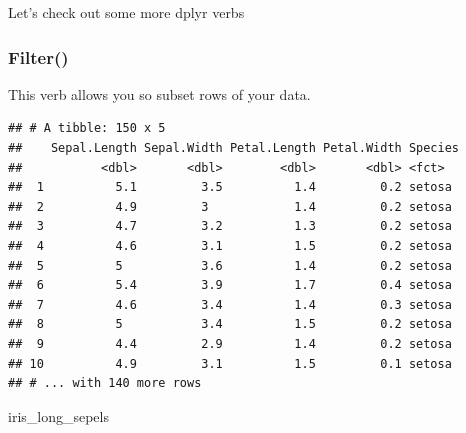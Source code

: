 \documentclass[
]{article}
\newenvironment{Shaded}{\begin{snugshade}}{\end{snugshade}}
\newcommand{\CommentTok}[1]{\textcolor[rgb]{0.56,0.35,0.01}{\textit{#1}}}
\newcommand{\FloatTok}[1]{\textcolor[rgb]{0.00,0.00,0.81}{#1}}
\newcommand{\KeywordTok}[1]{\textcolor[rgb]{0.13,0.29,0.53}{\textbf{#1}}}
\newcommand{\NormalTok}[1]{#1}
\newcommand{\OperatorTok}[1]{\textcolor[rgb]{0.81,0.36,0.00}{\textbf{#1}}}
\newcommand{\StringTok}[1]{\textcolor[rgb]{0.31,0.60,0.02}{#1}}
\begin{document}
Let's check out some more dplyr verbs

\hypertarget{filter}{%
\subsubsection{Filter()}\label{filter}}

This verb allows you so subset rows of your data.

\begin{Shaded}
\end{Shaded}

\begin{verbatim}
## # A tibble: 150 x 5
##    Sepal.Length Sepal.Width Petal.Length Petal.Width Species
##           <dbl>       <dbl>        <dbl>       <dbl> <fct>  
##  1          5.1         3.5          1.4         0.2 setosa 
##  2          4.9         3            1.4         0.2 setosa 
##  3          4.7         3.2          1.3         0.2 setosa 
##  4          4.6         3.1          1.5         0.2 setosa 
##  5          5           3.6          1.4         0.2 setosa 
##  6          5.4         3.9          1.7         0.4 setosa 
##  7          4.6         3.4          1.4         0.3 setosa 
##  8          5           3.4          1.5         0.2 setosa 
##  9          4.4         2.9          1.4         0.2 setosa 
## 10          4.9         3.1          1.5         0.1 setosa 
## # ... with 140 more rows
\end{verbatim}

\begin{Shaded}
\begin{Highlighting}[]
\NormalTok{iris_long_sepels}
\end{Highlighting}
\end{Shaded}
\end{document}
